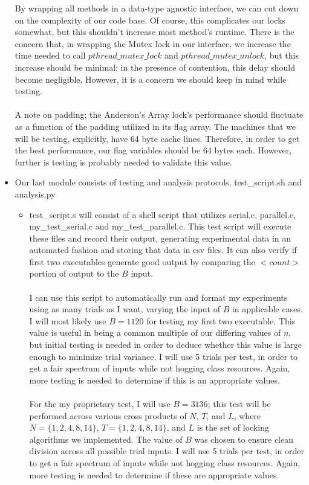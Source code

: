 \documentclass[]{article}
\begin{document}
\begin{itemize}
	By wrapping all methods in a data-type agnostic interface, we can cut down on the complexity of our code base. Of course, this complicates our locks somewhat, but this shouldn't increase most method's runtime. There is the concern that, in wrapping the Mutex lock in our interface, we increase the time needed to call $pthread\_mutex\_lock$ and $pthread\_mutex\_unlock$, but this increase should be minimal; in the presence of contention, this delay should become negligible. However, it is a concern we should keep in mind while testing.
	\\\\
	A note on padding; the Anderson's Array lock's performance should fluctuate as a function of the padding utilized in its flag array. The machines that we will be testing, explicitly, have 64 byte cache lines. Therefore, in order to get the best performance, our flag variables should be 64 bytes each. However, further is testing is probably needed to validate this value.
	\item Our last module consists of testing and analysis protocols, test\_script.sh and analysis.py
	\begin{itemize}
		\item test\_script.s will consist of a shell script that utilizes serial.c, parallel.c, my\_test\_serial.c and my\_test\_parallel.c. This test script will execute these files and record their output, generating experimental data in an automated fashion and storing that data in csv files. It can also verify if first two executables generate good output by comparing the $<count>$ portion of output to the $B$ input.
		\\\\
		I can use this script to automatically run and format my experiments using as many trials as I want, varying the input of $B$ in applicable cases. I will most likely use $B = 1120$ for testing my first two executable. This value is useful in being a common multiple of our differing values of $n$, but initial testing is needed in order to deduce whether this value is large enough to minimize trial variance. I will use 5 trials per test, in order to get a fair spectrum of inputs while not hogging class resources. Again, more testing is needed to determine if this is an appropriate values.
		\\\\
		For the my proprietary test, I will use $B = 3136$; this test will be performed across various cross products of $N$, $T$, and $L$, where $N = \{1, 2, 4, 8, 14\}$, $T = \{1, 2, 4, 8, 14\}$, and $L$ is the set of locking algorithms we implemented. The value of $B$ was chosen to ensure clean division across all possible trial inputs.  I will use 5 trials per test, in order to get a fair spectrum of inputs while not hogging class resources. Again, more testing is needed to determine if these are appropriate values.
		

\end{itemize}
\end{itemize}
\end{document}

